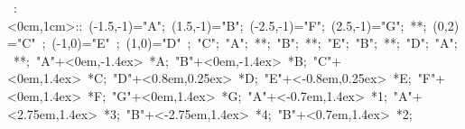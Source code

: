 %

\hbox{
\xy    <1cm,0cm>:<0cm,1cm>::
       (-1.5,-1)="A"; (1.5,-1)="B"; (-2.5,-1)="F"; (2.5,-1)="G"; **\dir{-};
       (0,2)="C" ; (-1,0)="E" ; (1,0)="D" ; 
       "C"; "A";  **\dir{-}; "B";  **\dir{-}; 
       "E"; "B"; **\dir{-};  "D"; "A"; **\dir{-}; 
       "A"+<0em,-1.4ex> *{A}; 
       "B"+<0em,-1.4ex> *{B}; 
       "C"+<0em,1.4ex> *{C}; 
       "D"+<0.8em,0.25ex> *{D}; 
       "E"+<-0.8em,0.25ex> *{E}; 
       "F"+<0em,1.4ex> *{F}; 
       "G"+<0em,1.4ex> *{G};
       "A"+<-0.7em,1.4ex> *{1};
       "A"+<2.75em,1.4ex> *{3};
       "B"+<-2.75em,1.4ex> *{4};
       "B"+<0.7em,1.4ex> *{2};
       \endxy}
	   

